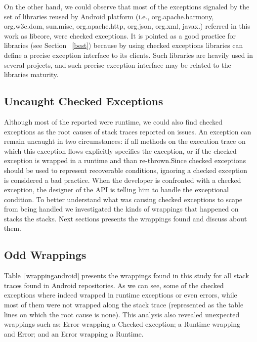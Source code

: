 \documentclass[conference]{IEEEtran}
\begin{document}
On the other hand, we could observe that most of the exceptions signaled by the set of libraries reused by Android platform (i.e., org.apache.harmony, org.w3c.dom, sun.misc, org.apache.http, org.json, org.xml, javax.) referred in this work as libcore, were checked exceptions. 
It is pointed as a good practice for libraries (see Section ~\ref{best}) because by using checked exceptions libraries can define a precise exception interface to its clients. Such libraries are heavily used in several projects, and such precise exception interface may be related to the libraries maturity.

\subsection{Uncaught Checked Exceptions}

Although most of the reported were runtime, we could also find checked exceptions as the root causes of stack traces reported on issues. An exception can remain uncaught in two circumstances: if all methods on the execution trace on which this exception flows explicitly specifies the exception, or if the checked exception is wrapped in a runtime and than re-thrown.Since checked exceptions should be used to represent recoverable conditions, ignoring a checked exception is considered a bad practice. When the developer is confronted with a checked exception, the designer of the API is telling him to handle the exceptional condition. To better understand what was causing checked exceptions to scape from being handled we investigated the kinds of wrappings that happened on stacks the stacks.  Next sections presents the wrappings found and discuss about them.

\subsection{Odd Wrappings}

 Table~\ref{wrappingandroid} presents the wrappings found in this study for all stack traces found in Android repositories. As we can see, some of the checked exceptions where indeed wrapped in runtime exceptions or even errors, while most of them were not wrapped along the stack trace (represented as the table lines on which the root cause is none). This analysis also revealed unexpected wrappings such as: Error wrapping a Checked exception; a Runtime wrapping and Error; and an Error wrapping a Runtime.
\end{document}
